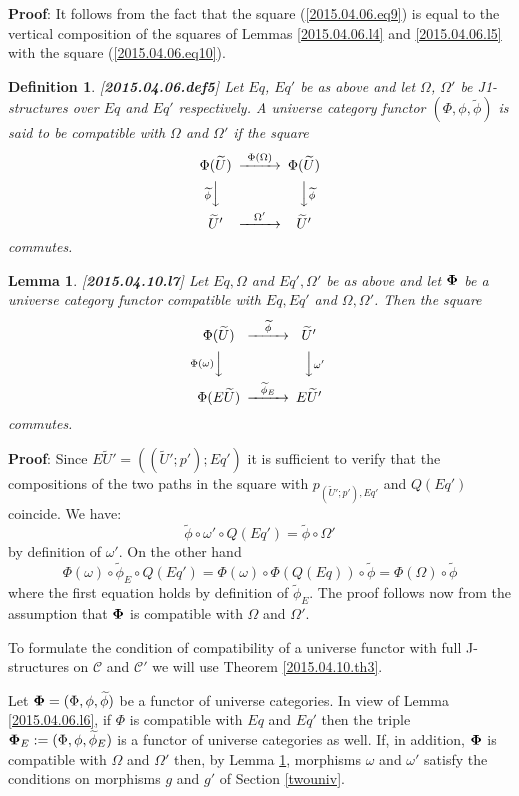 \documentclass[12pt]{article}
\newenvironment{myproof}{{\bf Proof}:}{\vskip 5mm }
\newtheorem{lemma}[proposition]{Lemma}
\newtheorem{definition}[proposition]{Definition}
\newcommand{\llabel}[1]{\label{#1}[{\bf #1}]}
\newcommand{\wt}{\widetilde}
\begin{document}
%
\begin{myproof}
It follows from the fact that the square (\ref{2015.04.06.eq9}) is equal to the vertical composition of the 
squares of Lemmas \ref{2015.04.06.l4} and \ref{2015.04.06.l5} with the square (\ref{2015.04.06.eq10}).
\end{myproof}
%


\begin{definition}
\llabel{2015.04.06.def5}
Let $Eq$, $Eq'$ be as above and let $\Omega$, $\Omega'$ be J1-structures over $Eq$ and $Eq'$ respectively. A universe category functor $(\Phi,\phi,\wt{\phi})$ is said to be compatible with $\Omega$ and $\Omega'$ if the square
%
$$
\begin{CD}
\Phi(\wt{U}) @>\Phi(\Omega)>> \Phi(\wt{U})\\
@V\wt{\phi} VV @VV\wt{\phi} V\\
\wt{U}' @>\Omega'>> \wt{U}'
\end{CD}
$$
%
commutes.
\end{definition}
%
\begin{lemma}
\llabel{2015.04.10.l7}
Let $Eq,\Omega$ and $Eq',\Omega'$ be as above and let ${\bf\Phi}$ be a universe category functor compatible with $Eq,Eq'$ and $\Omega,\Omega'$. Then the square
%
$$
\begin{CD}
\Phi(\wt{U}) @>\wt{\phi}>> \wt{U}'\\
@V\Phi(\omega)VV @VV\omega' V\\
\Phi(E\wt{U}) @>\wt{\phi}_{E}>> E\wt{U}'
\end{CD}
$$
%
commutes.
\end{lemma}
%
\begin{myproof}
Since $E\wt{U}'=((\wt{U}';p');Eq')$ it is sufficient to verify that the compositions of the two paths in the square with $p_{(\wt{U}';p'),Eq'}$ and $Q(Eq')$ coincide. We have:
%
$$\wt{\phi}\circ\omega'\circ Q(Eq')=\wt{\phi}\circ\Omega'$$
%
by definition of $\omega'$. On the other hand
%
$$\Phi(\omega)\circ \wt{\phi}_{E}\circ Q(Eq')=\Phi(\omega)\circ \Phi(Q(Eq))\circ \wt{\phi}=\Phi(\Omega)\circ\wt{\phi}$$
%
where the first equation holds by definition of $\wt{\phi}_{E}$. The proof follows now from the assumption that ${\bf\Phi}$ is compatible with $\Omega$ and $\Omega'$. 
\end{myproof}
%


To formulate the condition of compatibility of a universe functor with full J-structures on $\mathcal C$ and $\mathcal C'$ we will use Theorem \ref{2015.04.10.th3}.

Let ${\bf\Phi}=(\Phi,\phi,\wt{\phi})$ be a functor of universe categories. In view of Lemma \ref{2015.04.06.l6}, if $\Phi$ is compatible with $Eq$ and $Eq'$ then the triple ${\bf\Phi}_{E}:=(\Phi,\phi,\wt{\phi}_{E})$ is a functor of universe categories as well. If, in addition, ${\bf\Phi}$ is compatible with $\Omega$ and $\Omega'$ then, by Lemma \ref{2015.04.10.l7}, morphisms $\omega$ and $\omega'$ satisfy the conditions on morphisms $g$ and $g'$ of Section \ref{twouniv}. 
\end{document}
